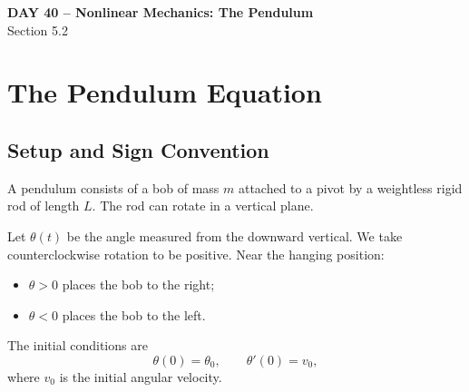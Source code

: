 \documentclass[11pt,letterpaper]{article}
\begin{document}
\begin{center}
\Large\textbf{DAY 40 -- Nonlinear Mechanics: The Pendulum}\\
\normalsize Section 5.2
\end{center}

\section{The Pendulum Equation}

\subsection{Setup and Sign Convention}

A pendulum consists of a bob of mass $m$ attached
to a pivot by a weightless rigid rod of length $L$.
The rod can rotate in a vertical plane.

Let $\theta(t)$ be the angle measured from the
downward vertical. We take counterclockwise rotation
to be positive. Near the hanging position:
\begin{itemize}
    \item $\theta>0$ places the bob to the right;
    \item $\theta<0$ places the bob to the left.
\end{itemize}

The initial conditions are
\[
\theta(0)=\theta_0,
\qquad
\theta'(0)=v_0,
\]
where $v_0$ is the initial angular velocity.

\begin{center}
\end{center}
\end{document}
